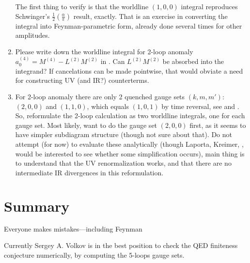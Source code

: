 \begin{enumerate}
The first thing to verify is that the worldline $(1,0,0)$ integral
reproduces Schwinger's $\frac{1}{2}\left(\frac{\alpha}{\pi}\right)$
result, exactly. That is an exercise in converting the
integral into Feynman-parametric form, already done several times for
other amplitudes.
  \item
Please write down the worldline integral for 2-loop anomaly
$a_{0}^{(4)}=M^{(4)}-L^{(2)}M^{(2)}$ in .
Can $L^{(2)}M^{(2)}$ be absorbed into the integrand? If cancelations can
be made pointwise, that would obviate a need for constructing UV  (and
IR?) counterterms.
  \item
For 2-loop anomaly there are only 2 quenched gauge sets $(k,m,m')$:
$(2,0,0)$ and $(1,1,0)$, which equals $(1,0,1)$ by time reversal, see
 and .
So, reformulate the 2-loop calculation as two worldline integrals,
one for each gauge set.
Most likely, want to do the gauge set $(2,0,0)$ first, as it seems to
have simpler subdiagram structure (though not sure about that).
Do not attempt (for now) to evaluate these analytically (though Laporta,
Kreimer, \etc, would be interested to see whether some simplification
occurs), main thing is to understand that the UV renormalization works,
and that there are no intermediate IR divergences in this reformulation.
\end{enumerate}



\section{Summary}
\label{sect:Summary}

\begin{bartlett}{
{Everyone makes mistakes—including {Feynman}}
        }
\end{bartlett}
\bigskip

\noindent
Currently Sergey  A. Volkov is in the best position to check the QED
finiteness conjecture numerically, by computing the 5-loops gauge sets.

